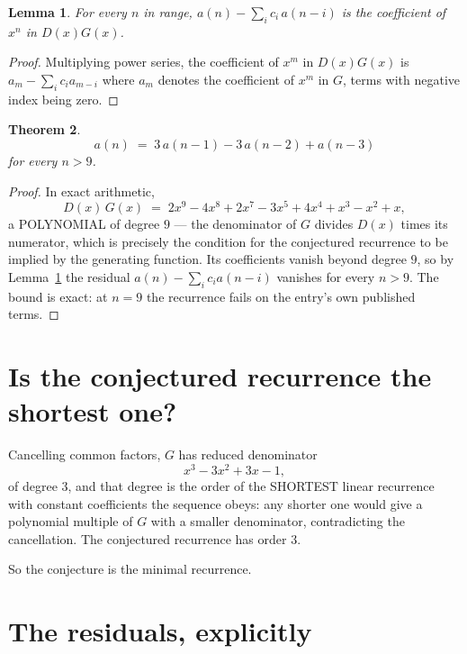 \documentclass[11pt,a4paper]{article}
\theoremstyle{plain}
\newtheorem{theorem}{Theorem}
\newtheorem{lemma}[theorem]{Lemma}
\theoremstyle{definition}
\begin{document}
\begin{lemma}\label{lem:key}
For every $n$ in range, $a(n)-\sum_i c_i\,a(n-i)$ is the coefficient of $x^{n}$ in
$D(x)G(x)$.
\end{lemma}

\begin{proof}
Multiplying power series, the coefficient of $x^{m}$ in $D(x)G(x)$ is
$a_m-\sum_i c_i a_{m-i}$ where $a_m$ denotes the coefficient of $x^{m}$ in $G$, terms with
negative index being zero.
\end{proof}

\begin{theorem}
\[
a(n)\;=\;3\,a(n-1) - 3\,a(n-2) + a(n-3)
\]
for every $n>9$.
\end{theorem}

\begin{proof}
In exact arithmetic,
\[
D(x)\,G(x)\;=\;2 x^{9} - 4 x^{8} + 2 x^{7} - 3 x^{5} + 4 x^{4} + x^{3} - x^{2} + x,
\]
a POLYNOMIAL of degree $9$ --- the denominator of $G$ divides $D(x)$ times its numerator,
which is precisely the condition for the conjectured recurrence to be implied by the
generating function. Its coefficients vanish beyond degree $9$, so by
Lemma~\ref{lem:key} the residual $a(n)-\sum_ic_ia(n-i)$ vanishes for every
$n>9$. The bound is exact: at $n=9$ the recurrence fails on the entry's own published terms.
\end{proof}

\section{Is the conjectured recurrence the shortest one?}

Cancelling common factors, $G$ has reduced denominator
\[
x^{3} - 3 x^{2} + 3 x - 1,
\]
of degree $3$, and that degree is the order of the SHORTEST linear recurrence with
constant coefficients the sequence obeys: any shorter one would give a polynomial multiple of
$G$ with a smaller denominator, contradicting the cancellation. The conjectured recurrence has
order $3$.

So the conjecture is the minimal recurrence.

\section{The residuals, explicitly}
\end{document}
